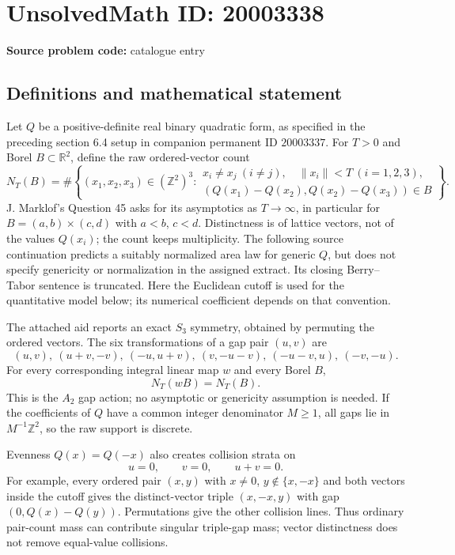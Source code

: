 \documentclass[11pt]{article}
\newcommand{\Z}{\mathbb{Z}}
\newcommand{\R}{\mathbb{R}}
\begin{document}
\section*{UnsolvedMath ID: 20003338}
\textbf{Source problem code:} catalogue entry
\subsection{Definitions and mathematical statement}
Let $Q$ be a positive-definite real binary quadratic form, as specified in the preceding section 6.4 setup in companion permanent ID $20003337$. For $T>0$ and Borel $B\subset\R^2$, define the raw ordered-vector count
\[
 N_T(B)=\#\left\{(x_1,x_2,x_3)\in(\Z^2)^3:
 \begin{array}{l}
 x_i\ne x_j\ (i\ne j),\quad\|x_i\|<T\ (i=1,2,3),\\
 (Q(x_1)-Q(x_2),Q(x_2)-Q(x_3))\in B
 \end{array}\right\}.
\]
J. Marklof's Question 45 asks for its asymptotics as $T\to\infty$, in particular for $B=(a,b)\times(c,d)$ with $a<b$, $c<d$. Distinctness is of lattice vectors, not of the values $Q(x_i)$; the count keeps multiplicity. The following source continuation predicts a suitably normalized area law for generic $Q$, but does not specify genericity or normalization in the assigned extract. Its closing Berry--Tabor sentence is truncated. Here the Euclidean cutoff is used for the quantitative model below; its numerical coefficient depends on that convention.

The attached aid reports an exact $S_3$ symmetry, obtained by permuting the ordered vectors. The six transformations of a gap pair $(u,v)$ are
\[
 (u,v),\ (u+v,-v),\ (-u,u+v),\ (v,-u-v),\ (-u-v,u),\ (-v,-u).
\]
For every corresponding integral linear map $w$ and every Borel $B$,
\[
 N_T(wB)=N_T(B).
\]
This is the $A_2$ gap action; no asymptotic or genericity assumption is needed. If the coefficients of $Q$ have a common integer denominator $M\ge1$, all gaps lie in $M^{-1}\Z^2$, so the raw support is discrete.

Evenness $Q(x)=Q(-x)$ also creates collision strata on
\[
 u=0,\qquad v=0,\qquad u+v=0.
\]
For example, every ordered pair $(x,y)$ with $x\ne0$, $y\notin\{x,-x\}$ and both vectors inside the cutoff gives the distinct-vector triple $(x,-x,y)$ with gap $(0,Q(x)-Q(y))$. Permutations give the other collision lines. Thus ordinary pair-count mass can contribute singular triple-gap mass; vector distinctness does not remove equal-value collisions.
\end{document}
